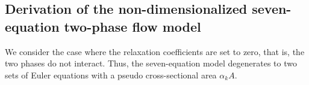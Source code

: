 \documentclass[preprint,10pt]{elsarticle}
\begin{document}
%
%
\subsection{Derivation of the non-dimensionalized  seven-equation two-phase flow model}\label{sec:scaled-SEM}
We consider the case where the relaxation coefficients are set to zero, that is,  
the two phases do not interact. Thus, the seven-equation model degenerates to two sets of Euler equations with a pseudo cross-sectional area $\alpha_k A$. 
\end{document}
